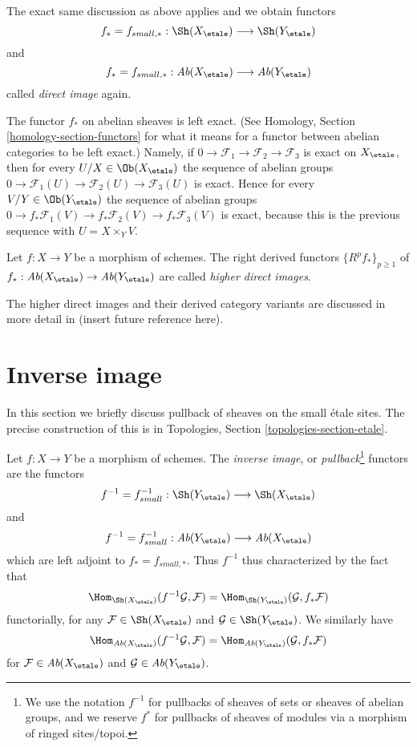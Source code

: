 \noindent
The exact same discussion as above applies and we obtain functors
$$
f_* = f_{small, *} :
\Sh(X_\etale)
\longrightarrow
\Sh(Y_\etale)
$$
and
$$
f_* = f_{small, *} :
\textit{Ab}(X_\etale)
\longrightarrow
\textit{Ab}(Y_\etale)
$$
called {\it direct image} again.

\medskip\noindent
The functor $f_*$ on abelian sheaves is left exact. (See
Homology, Section \ref{homology-section-functors}
for what it means for a functor between abelian categories to be left exact.)
Namely, if
$0 \to \mathcal{F}_1 \to \mathcal{F}_2 \to \mathcal{F}_3$
is exact on $X_\etale$, then for every
$U/X \in \Ob(X_\etale)$
the sequence of abelian groups
$0 \to \mathcal{F}_1(U) \to \mathcal{F}_2(U) \to \mathcal{F}_3(U)$
is exact. Hence for every $V/Y \in \Ob(Y_\etale)$
the sequence of abelian groups
$0 \to f_*\mathcal{F}_1(V) \to f_*\mathcal{F}_2(V) \to f_*\mathcal{F}_3(V)$
is exact, because this is the previous sequence with $U = X \times_Y V$.

\begin{definition}
\label{definition-higher-direct-images}
Let $f: X \to Y$ be a morphism of schemes.
The right derived functors $\{R^pf_*\}_{p \geq 1}$ of
$f_* : \textit{Ab}(X_\etale) \to \textit{Ab}(Y_\etale)$
are called {\it higher direct images}.
\end{definition}

\noindent
The higher direct images and their derived category variants are
discussed in more detail in (insert future reference here).



\section{Inverse image}
\label{section-inverse-image}

\noindent
In this section we briefly discuss pullback of sheaves on the small
\'etale sites. The precise construction of this is in
Topologies, Section \ref{topologies-section-etale}.

\begin{definition}
\label{definition-inverse-image}
Let $f: X\to Y$ be a morphism of schemes. The {\it inverse image}, or
{\it pullback}\footnote{We use the notation $f^{-1}$ for pullbacks of
sheaves of sets or sheaves of abelian groups, and we reserve $f^*$ for
pullbacks of sheaves of modules via a morphism of ringed sites/topoi.}
functors are the functors
$$
f^{-1} = f_{small}^{-1} :
\Sh(Y_\etale)
\longrightarrow
\Sh(X_\etale)
$$
and
$$
f^{-1} = f_{small}^{-1} :
\textit{Ab}(Y_\etale)
\longrightarrow
\textit{Ab}(X_\etale)
$$
which are left adjoint to $f_* = f_{small, *}$. Thus
$f^{-1}$ thus characterized by the fact that
$$
\Hom_{{\Sh(X_\etale)}} (f^{-1}\mathcal{G}, \mathcal{F})
=
\Hom_{\Sh(Y_\etale)} (\mathcal{G}, f_*\mathcal{F})
$$
functorially, for any $\mathcal{F} \in \Sh(X_\etale)$ and
$\mathcal{G} \in \Sh(Y_\etale)$. We similarly have
$$
\Hom_{{\textit{Ab}(X_\etale)}} (f^{-1}\mathcal{G}, \mathcal{F})
=
\Hom_{\textit{Ab}(Y_\etale)} (\mathcal{G}, f_*\mathcal{F})
$$
for $\mathcal{F} \in \textit{Ab}(X_\etale)$ and
$\mathcal{G} \in \textit{Ab}(Y_\etale)$.
\end{definition}

